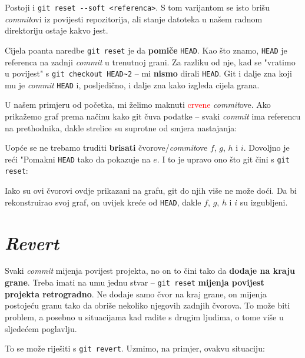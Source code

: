 
Postoji i \verb+git reset --soft <referenca>+. 
S tom varijantom se isto brišu \emph{commit}ovi iz povijesti repozitorija, ali stanje datoteka u našem radnom direktoriju ostaje kakvo jest.

Cijela poanta naredbe \verb+git reset+ je da \textbf{pomiče} \verb+HEAD+.
Kao što znamo, \verb+HEAD+ je referenca na zadnji \emph{commit} u trenutnoj grani.
Za razliku od nje, kad se "vratimo u povijest" s \verb+git checkout HEAD~2+ -- mi \textbf{nismo} dirali \verb+HEAD+.
Git i dalje zna koji mu je \emph{commit} \verb+HEAD+ i, posljedično, i dalje zna kako izgleda cijela grana.

U našem primjeru od početka, mi želimo maknuti \textcolor{red}{crvene} \emph{commit}ove. 
Ako prikažemo graf prema načinu kako git čuva podatke -- svaki \emph{commit} ima referencu na prethodnika, dakle strelice su suprotne od smjera nastajanja:



Uopće se ne trebamo truditi \textbf{brisati} čvorove/\emph{commit}ove $f$, $g$, $h$ i $i$.
Dovoljno je reći "Pomakni \verb+HEAD+ tako da pokazuje na $e$.
I to je upravo ono što git čini s \verb+git reset+:



Iako su ovi čvorovi ovdje prikazani na grafu, git do njih više ne može doći.
Da bi rekonstruirao svoj graf, on uvijek kreće od \verb+HEAD+, dakle $f$, $g$, $h$ i $i$ su izgubljeni.

\section*{\emph{Revert}}

Svaki \emph{commit} mijenja povijest projekta, no on to čini tako da \textbf{dodaje na kraju grane}.
Treba imati na umu jednu stvar -- \verb+git reset+ \textbf{mijenja povijest projekta retrogradno}.
Ne dodaje samo čvor na kraj grane, on mijenja postojeću granu tako da obriše nekoliko njegovih zadnjih čvorova.
To može biti problem, a posebno u situacijama kad radite s drugim ljudima, o tome više u sljedećem poglavlju.

To se može riješiti s \verb+git revert+. Uzmimo, na primjer, ovakvu situaciju:



